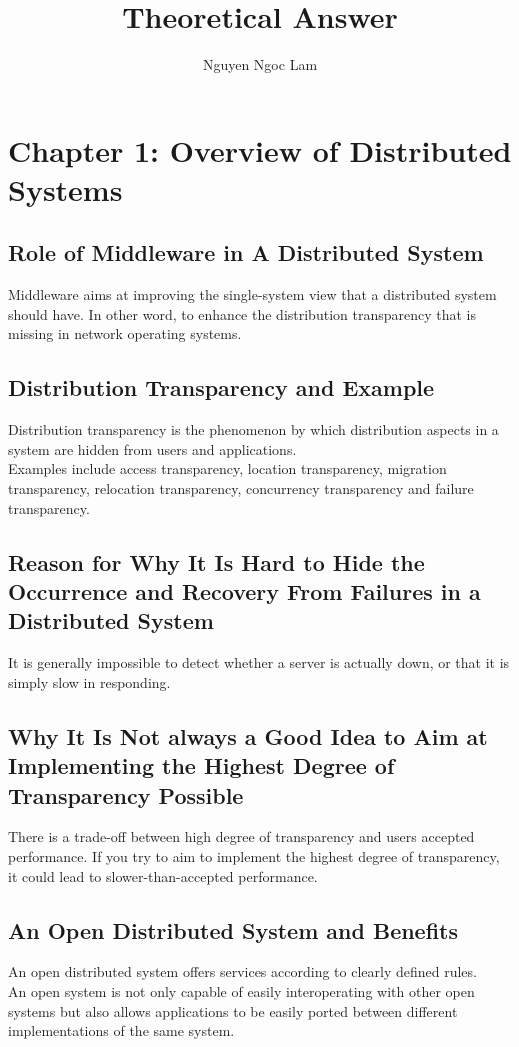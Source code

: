 \documentclass[11pt,a4paper]{report}
\title{Theoretical Answer}
\date{\displaydate{date}}
\author{Nguyen Ngoc Lam}
\begin{document}
  	\tableofcontents
  	\newpage
	
	\chapter{Chapter 1: Overview of Distributed Systems}
	\newpage
  	\section{Role of Middleware in A Distributed System}
  	Middleware aims at improving the single-system view that a distributed system should have. In other word, to enhance the distribution transparency that is missing in network operating systems.
  	
  	\section{Distribution Transparency and Example}
  	Distribution transparency is the phenomenon by which distribution aspects
in a system are hidden from users and applications. \\
Examples include access transparency, location transparency, migration transparency, relocation transparency, concurrency transparency and failure transparency.

 	\section{Reason for Why It Is Hard to Hide the Occurrence and Recovery From Failures in a Distributed System}
  	It is generally impossible to detect whether a server is actually down, or
that it is simply slow in responding.

  	\section{Why It Is Not always a Good Idea to Aim at Implementing the Highest Degree of Transparency Possible}
  	There is a trade-off between high degree of transparency and users accepted performance. If you try to aim to implement the highest degree of transparency, it could lead to slower-than-accepted performance.
  	
	\section{An Open Distributed System and Benefits}
	An open distributed system offers services according to clearly defined
rules. \\
An open system is not only capable of easily interoperating with other open systems but also allows applications to be easily ported between different implementations of the same system.
\end{document}
